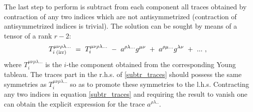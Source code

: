 \documentclass[12pt,preprintnumbers,nofootinbib]{revtex4}
\begin{document}
	The last step to perform is subtract from each component
	all traces obtained by contraction of any two indices which
	are not antisymmetrized (contraction of antisymmetrized indices is
	trivial).
	The solution can be sought by means of a tensor of a rank
	$ r - 2 $:
\begin{equation}
\label{subtr_traces}
	T_{i\;{\rm (irr)}}^{\mu\nu\rho\lambda...} ~=~
	T_i^{\mu\nu\rho\lambda...}  ~-~  a^{\rho\lambda...}g^{\mu\nu} 
				  ~+~  a^{\rho\mu...}g^{\lambda\nu} ~+~ ...~,
\end{equation}
	where $ T_i^{\mu\nu\rho\lambda...} $ is the $ i $-the component
	obtained from the corresponding Young tableau.
	The traces part in the r.h.s. of \eqref{subtr_traces} should 
	possess the same symmetries as $ T_i^{\mu\nu\rho\lambda...} $
	so as to promote these symmetries to the l.h.s.
	Contracting any two indices in equation \eqref{subtr_traces} and
	requiring the result to vanish one can obtain the explicit expression
	for the trace $ a^{\rho\lambda..} $.


	



	
\end{document}
